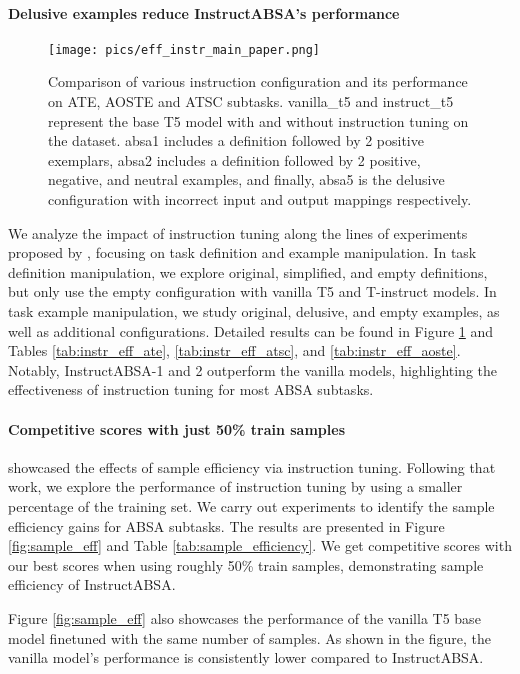\documentclass[11pt]{article}
\newcommand{\name}{\textsc{I}nstruct\textsc{ABSA}\xspace}
\begin{document}
\paragraph{Delusive examples reduce \name{}'s performance} 

\begin{figure}[t!]
	\centering
	\texttt{[image: pics/eff\_instr\_main\_paper.png]}
	\caption{Comparison of various instruction configuration and its performance on ATE, AOSTE and ATSC subtasks. 
 vanilla\_t5 and instruct\_t5 represent the base T5 model with and without instruction tuning on the dataset. 
 absa1 includes a definition followed by 2 positive exemplars, absa2 includes a definition followed by 2 positive, negative, and neutral examples, and finally, absa5 is the delusive configuration with incorrect input and output mappings respectively.}
	\label{fig:eff_instr}
\end{figure} 


We analyze the impact of instruction tuning along the lines of experiments proposed by \citet{kung2023models}, focusing on task definition and example manipulation. 
In task definition manipulation, we explore original, simplified, and empty definitions, but only use the empty configuration with vanilla T5 and T-instruct models. 
In task example manipulation, we study original, delusive, and empty examples, as well as additional configurations. 
Detailed results can be found in Figure \ref{fig:eff_instr} and Tables \ref{tab:instr_eff_ate}, \ref{tab:instr_eff_atsc}, and \ref{tab:instr_eff_aoste}. 
Notably, \name{}-1 and 2 outperform the vanilla models, highlighting the effectiveness of instruction tuning for most ABSA subtasks.

\paragraph{Competitive scores with just 50\% train samples}
\citet{gupta2023instruction} showcased the effects of sample efficiency via instruction tuning. 
Following that work, we explore the performance of instruction tuning by using a smaller percentage of the training set. 
We carry out experiments to identify the sample efficiency gains for ABSA subtasks. 
The results are presented in Figure \ref{fig:sample_eff} and Table \ref{tab:sample_efficiency}. 
We get competitive scores with our best scores when using roughly 50\% train samples, demonstrating sample efficiency of \name{}. 

Figure \ref{fig:sample_eff} also showcases the performance of the vanilla T5 base model finetuned with the same number of samples.
As shown in the figure, the vanilla model's performance is consistently lower compared to \name{}.
\end{document}
